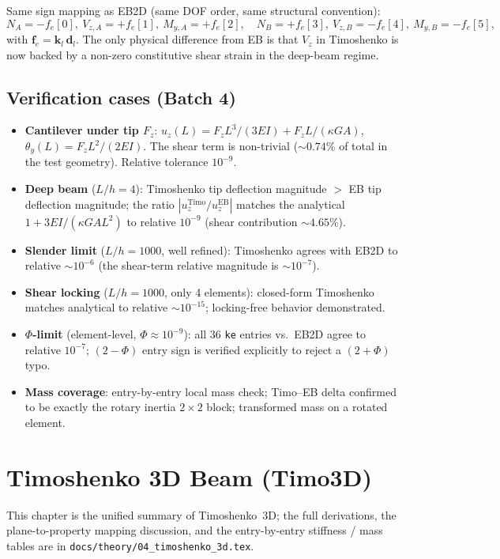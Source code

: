 \documentclass[11pt,a4paper]{book}
\newcommand{\bmath}[1]{\boldsymbol{#1}}
\begin{document}
Same sign mapping as EB2D (same DOF order, same structural convention):
\[
N_A = -f_e[0],\ V_{z,A} = +f_e[1],\ M_{y,A} = +f_e[2],\quad
N_B = +f_e[3],\ V_{z,B} = -f_e[4],\ M_{y,B} = -f_e[5],
\]
with $\bmath{f}_e = \bmath{k}_l\,\bmath{d}_l$. The only physical difference from EB is that $V_z$ in Timoshenko is now backed by a non-zero constitutive shear strain in the deep-beam regime.

\section{Verification cases (Batch 4)}\label{sec:timo2d-verification}

\begin{itemize}[leftmargin=*]
    \item \textbf{Cantilever under tip $F_z$}: $u_z(L) = F_z L^3/(3EI) + F_z L/(\kappa GA)$, $\theta_y(L) = F_z L^2/(2EI)$. The shear term is non-trivial ($\sim 0.74\%$ of total in the test geometry). Relative tolerance $10^{-9}$.
    \item \textbf{Deep beam} ($L/h = 4$): Timoshenko tip deflection magnitude $> $ EB tip deflection magnitude; the ratio $|u_z^{\text{Timo}}/u_z^{\text{EB}}|$ matches the analytical $1 + 3 EI/(\kappa GA L^2)$ to relative $10^{-9}$ (shear contribution $\sim 4.65\%$).
    \item \textbf{Slender limit} ($L/h = 1000$, well refined): Timoshenko agrees with EB2D to relative $\sim 10^{-6}$ (the shear-term relative magnitude is $\sim 10^{-7}$).
    \item \textbf{Shear locking} ($L/h = 1000$, only 4 elements): closed-form Timoshenko matches analytical to relative $\sim 10^{-15}$; locking-free behavior demonstrated.
    \item \textbf{$\Phi$-limit} (element-level, $\Phi \approx 10^{-9}$): all 36 \texttt{ke} entries vs.\ EB2D agree to relative $10^{-7}$; $(2-\Phi)$ entry sign is verified explicitly to reject a $(2+\Phi)$ typo.
    \item \textbf{Mass coverage}: entry-by-entry local mass check; Timo--EB delta confirmed to be exactly the rotary inertia $2\times 2$ block; transformed mass on a rotated element.
\end{itemize}

\chapter{Timoshenko 3D Beam (Timo3D)}\label{ch:timo3d}

This chapter is the unified summary of Timoshenko~3D; the full derivations, the plane-to-property mapping discussion, and the entry-by-entry stiffness / mass tables are in \texttt{docs/theory/04\_timoshenko\_3d.tex}.
\end{document}
